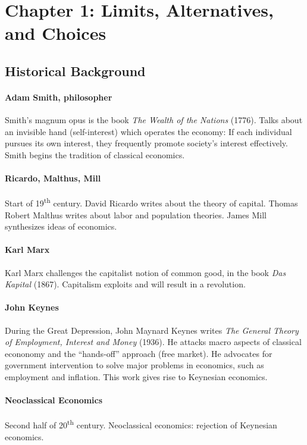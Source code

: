 \newpage
\section{Chapter 1: Limits, Alternatives, and Choices}
\subsection{Historical Background}

\paragraph{Adam Smith, philosopher} Smith's magnum opus is the book \emph{The Wealth of the Nations} (1776). Talks about an invisible hand (self-interest) which operates the economy: If each individual pursues its own interest, they frequently promote society's interest effectively.	Smith begins the tradition of classical economics.

\paragraph{Ricardo, Malthus, Mill} Start of 19\textsuperscript{th} century. David Ricardo writes about the theory of capital. Thomas Robert Malthus writes about labor and population theories. James Mill synthesizes ideas of economics.

\paragraph{Karl Marx} Karl Marx challenges the capitalist notion of common good, in the book \emph{Das Kapital} (1867). Capitalism exploits and will result in a revolution.

\paragraph{John Keynes} During the Great Depression, John Maynard Keynes writes \emph{The General Theory of Employment, Interest and Money} (1936). He attacks macro aspects of classical econonomy and the ``hands-off'' approach (free market). He advocates for government intervention to solve major problems in economics, such as employment and inflation. This work gives rise to Keynesian economics.

\paragraph{Neoclassical Economics} Second half of 20\textsuperscript{th} century. Neoclassical economics: rejection of Keynesian economics.

